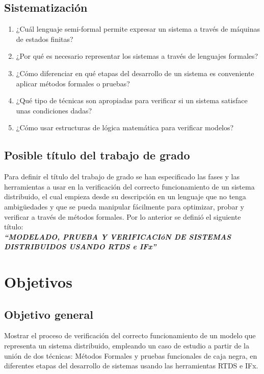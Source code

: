 \subsection{Sistematizaci\'on}

\begin{enumerate}

\item ¿Cu\'al lenguaje semi-formal permite expresar un sistema a trav\'es de 
m\'aquinas de estados finitas?
 \item ¿Por qu\'e es necesario representar los sistemas a trav\'es de lenguajes 
formales?
\item ¿C\'omo diferenciar en qu\'e etapas del desarrollo de un sistema es 
conveniente aplicar m\'etodos formales o pruebas?
\item ¿Qu\'e tipo de t\'ecnicas son apropiadas para verificar si un sistema 
satisface unas condiciones dadas?
\item ¿C\'omo usar estructuras de l\'ogica matem\'atica para verificar 
modelos?
\end{enumerate}

\subsection{Posible t\'itulo del trabajo de grado}
Para definir el t\'itulo del trabajo de grado se han especificado las fases y 
las herramientas a usar en la verificaci\'on del correcto funcionamiento de un 
sistema distribuido, el cual empieza desde su descripci\'on en un lenguaje que 
no tenga ambig\"uedades y que se pueda manipular f\'acilmente para optimizar, 
probar y verificar a trav\'es de m\'etodos formales. Por lo anterior se 
defini\'o el siguiente t\'itulo:
\\

\textbf{\textit{``MODELADO, PRUEBA Y VERIFICACI\'oN DE SISTEMAS DISTRIBUIDOS 
USANDO RTDS e IFx''}}


\section{Objetivos}

\subsection{Objetivo general}

Mostrar el proceso de verificaci\'on del correcto funcionamiento de un modelo 
que representa un sistema distribuido, empleando un caso de estudio a partir de 
la uni\'on de dos t\'ecnicas: M\'etodos Formales y pruebas funcionales de 
caja negra, en diferentes etapas del desarrollo de sistemas usando las 
herramientas RTDS e IFx.

